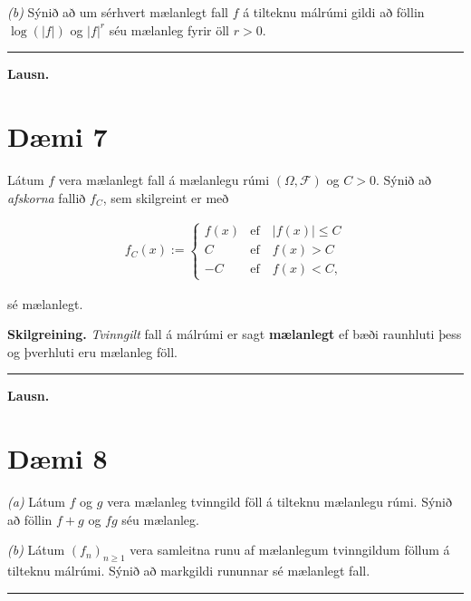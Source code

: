 \documentclass[]{book}
\begin{document}
\emph{(b)} Sýnið að um sérhvert mælanlegt fall \(f\) á tilteknu málrúmi gildi að föllin \(\log (|f|)\) og \(|f|^r\) séu mælanleg fyrir öll \(r > 0\).

\begin{center}\rule{0.5\linewidth}{\linethickness}\end{center}

\textbf{Lausn.}

\hypertarget{dmi-7-2}{%
\section*{Dæmi 7}\label{dmi-7-2}}

Látum \(f\) vera mælanlegt fall á mælanlegu rúmi \((\Omega, \mathcal F)\) og \(C > 0\). Sýnið að \emph{afskorna} fallið \(f_C\), sem skilgreint er með

\[
\begin{aligned}
f_C(x) := 
\begin{cases} 
f(x) &\text{ef} \quad |f(x)| \leq C \\
C &\text{ef} \quad f(x) > C \\
-C &\text{ef} \quad f(x) < C,
\end{cases}
\end{aligned}
\]

sé mælanlegt.

\textbf{Skilgreining.} \emph{Tvinngilt} fall á málrúmi er sagt \textbf{mælanlegt} ef bæði raunhluti þess og þverhluti eru mælanleg föll.

\begin{center}\rule{0.5\linewidth}{\linethickness}\end{center}

\textbf{Lausn.}

\hypertarget{dmi-8}{%
\section*{Dæmi 8}\label{dmi-8}}

\emph{(a)} Látum \(f\) og \(g\) vera mælanleg tvinngild föll á tilteknu mælanlegu rúmi. Sýnið að föllin \(f + g\) og \(fg\) séu mælanleg.

\emph{(b)} Látum \((f_n)_{n\geq1}\) vera samleitna runu af mælanlegum tvinngildum föllum á tilteknu málrúmi. Sýnið að markgildi rununnar sé mælanlegt fall.

\begin{center}\rule{0.5\linewidth}{\linethickness}\end{center}
\end{document}

